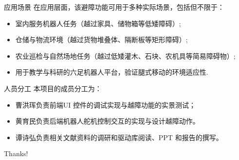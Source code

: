 \documentclass{beamer}
\begin{document}
\begin{frame}{应用场景}
    在应用层面，该避障功能可用于多种实际场景，包括但不限于：
    \begin{itemize}
        \item 室内服务机器人任务（越过家具、储物箱等低矮障碍）;
        \item 仓储与物流环境（越过货物堆叠体、隔断板等矩形障碍）;
        \item 农业巡检与自然场地任务（越过低矮灌木、石块、农机具等简易障碍物）;
        \item 用于教学与科研的六足机器人平台，验证腿式移动的环境适应性.
    \end{itemize}
\end{frame}

\begin{frame}{人员分工}
    本项目的成员分工为：
    \begin{itemize}
        \item 曹洪珲负责前端UI 控件的调试实现与越障功能的实景测试；
        \item 黄育民负责后端机器人舵机控制交互的实现与设计越障动作。
        \item 谭诗弘负责相关文献资料的调研和驱动库阅读、PPT 和报告的撰写。
    \end{itemize}
\end{frame}

\begin{frame}
    \begin{center}
        {\Huge\calligra Thanks!}
    \end{center}
\end{frame}
\end{document}
